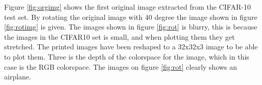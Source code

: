 
Figure \ref{fig:orgimg} shows the first original image extracted from the CIFAR-10 test set. By rotating the original image with 40 degree the image shown in figure \ref{fig:rotimg} is given. The images shown in figure \ref{fig:rot} is blurry, this is because the images in the CIFAR10 set is small, and when plotting them they get stretched. The printed images have been reshaped to a 32x32x3 image to be able to plot them. Three is the depth of the colorspace for the image, which in this case is the RGB colorspace. The images on figure \ref{fig:rot} clearly shows an airplane. 

